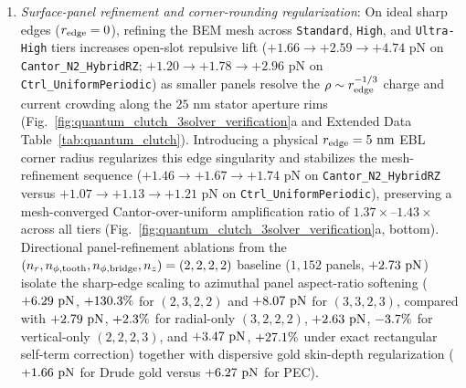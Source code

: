 \documentclass[pdflatex,sn-nature]{sn-jnl}
\DeclareRobustCommand{\roundtwo}[1]{\fpeval{round(#1,2)}}
\begin{document}
\begin{enumerate}
    \item \emph{Surface-panel refinement and corner-rounding regularization}: On ideal sharp edges ($r_{\rm edge} = 0$), refining the BEM mesh across \texttt{Standard}, \texttt{High}, and \texttt{Ultra-High} tiers increases open-slot repulsive lift ($+1.66 \to +2.59 \to +4.74\text{ pN}$ on \texttt{Cantor\_N2\_HybridRZ}; $+1.20 \to +1.78 \to +2.96\text{ pN}$ on \texttt{Ctrl\_UniformPeriodic}) as smaller panels resolve the $\rho \sim r_{\rm edge}^{-1/3}$ charge and current crowding along the $25\text{ nm}$ stator aperture rims (Fig.~\ref{fig:quantum_clutch_3solver_verification}a and Extended Data Table~\ref{tab:quantum_clutch}). Introducing a physical $r_{\rm edge} = 5\text{ nm}$ EBL corner radius regularizes this edge singularity and stabilizes the mesh-refinement sequence ($+1.46 \to +1.67 \to +1.74\text{ pN}$ on \texttt{Cantor\_N2\_HybridRZ} versus $+1.07 \to +1.13 \to +1.21\text{ pN}$ on \texttt{Ctrl\_UniformPeriodic}), preserving a mesh-converged Cantor-over-uniform amplification ratio of $1.37\times\text{--}1.43\times$ across all tiers (Fig.~\ref{fig:quantum_clutch_3solver_verification}a, bottom). Directional panel-refinement ablations from the $(n_r, n_{\phi,\rm tooth}, n_{\phi,\rm bridge}, n_z) = (2,2,2,2)$ baseline ($1{,}152$ panels, $+\roundtwo{\BemConvDirBaseFzPn}\text{ pN}$) isolate the sharp-edge scaling to azimuthal panel aspect-ratio softening ($+\roundtwo{\BemConvDirAzimuthalFzPn}\text{ pN}$, $+130.3{}\%$ for $(2,3,2,2)$ and $+\roundtwo{\BemConvDirHighFzPn}\text{ pN}$ for $(3,3,2,3)$, compared with $+\roundtwo{\BemConvDirRadialFzPn}\text{ pN}$, $+2.3{}\%$ for radial-only $(3,2,2,2)$, $+\roundtwo{\BemConvDirVerticalFzPn}\text{ pN}$, $-3.7{}\%$ for vertical-only $(2,2,2,3)$, and $+\roundtwo{\BemConvDirRectSelfFzPn}\text{ pN}$, $+27.1{}\%$ under exact rectangular self-term correction) together with dispersive gold skin-depth regularization ($+\roundtwo{\CantorNtwoHybridrzBemStdFZPn}\text{ pN}$ for Drude gold versus $+\roundtwo{\BemConvStdNxitwofourPecFzPn}\text{ pN}$ for PEC).

\end{enumerate}
\end{document}
